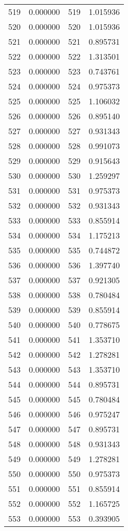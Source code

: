 \documentclass[12pt]{article}
\begin{document}
\begin{longtable}{@{}cccc@{}}
519 & 0.000000 & 519 & 1.015936 \\
520 & 0.000000 & 520 & 1.015936 \\
521 & 0.000000 & 521 & 0.895731 \\
522 & 0.000000 & 522 & 1.313501 \\
523 & 0.000000 & 523 & 0.743761 \\
524 & 0.000000 & 524 & 0.975373 \\
525 & 0.000000 & 525 & 1.106032 \\
526 & 0.000000 & 526 & 0.895140 \\
527 & 0.000000 & 527 & 0.931343 \\
528 & 0.000000 & 528 & 0.991073 \\
529 & 0.000000 & 529 & 0.915643 \\
530 & 0.000000 & 530 & 1.259297 \\
531 & 0.000000 & 531 & 0.975373 \\
532 & 0.000000 & 532 & 0.931343 \\
533 & 0.000000 & 533 & 0.855914 \\
534 & 0.000000 & 534 & 1.175213 \\
535 & 0.000000 & 535 & 0.744872 \\
536 & 0.000000 & 536 & 1.397740 \\
537 & 0.000000 & 537 & 0.921305 \\
538 & 0.000000 & 538 & 0.780484 \\
539 & 0.000000 & 539 & 0.855914 \\
540 & 0.000000 & 540 & 0.778675 \\
541 & 0.000000 & 541 & 1.353710 \\
542 & 0.000000 & 542 & 1.278281 \\
543 & 0.000000 & 543 & 1.353710 \\
544 & 0.000000 & 544 & 0.895731 \\
545 & 0.000000 & 545 & 0.780484 \\
546 & 0.000000 & 546 & 0.975247 \\
547 & 0.000000 & 547 & 0.895731 \\
548 & 0.000000 & 548 & 0.931343 \\
549 & 0.000000 & 549 & 1.278281 \\
550 & 0.000000 & 550 & 0.975373 \\
551 & 0.000000 & 551 & 0.855914 \\
552 & 0.000000 & 552 & 1.165725 \\
553 & 0.000000 & 553 & 0.393905 \\

\end{longtable}
\end{document}
